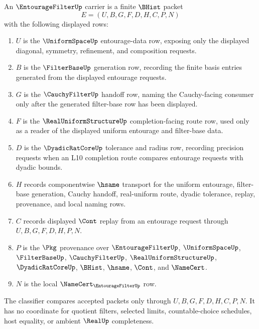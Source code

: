 \begin{definition}
\label{def:entourage-filter-carrier}
An $\EntourageFilterUp$ carrier is a finite $\BHist$ packet
$$
E=(U,B,G,F,D,H,C,P,N)
$$
with the following displayed rows:
\begin{enumerate}
\item $U$ is the $\UniformSpaceUp$ entourage-data row, exposing only the displayed diagonal, symmetry, refinement, and composition requests.
\item $B$ is the $\FilterBaseUp$ generation row, recording the finite basis entries generated from the displayed entourage requests.
\item $G$ is the $\CauchyFilterUp$ handoff row, naming the Cauchy-facing consumer only after the generated filter-base row has been displayed.
\item $F$ is the $\RealUniformStructureUp$ completion-facing route row, used only as a reader of the displayed uniform entourage and filter-base data.
\item $D$ is the $\DyadicRatCoreUp$ tolerance and radius row, recording precision requests when an L10 completion route compares entourage requests with dyadic bounds.
\item $H$ records componentwise $\hsame$ transport for the uniform entourage, filter-base generation, Cauchy handoff, real-uniform route, dyadic tolerance, replay, provenance, and local naming rows.
\item $C$ records displayed $\Cont$ replay from an entourage request through $U,B,G,F,D,H,P,N$.
\item $P$ is the $\Pkg$ provenance over $\EntourageFilterUp$, $\UniformSpaceUp$, $\FilterBaseUp$, $\CauchyFilterUp$, $\RealUniformStructureUp$, $\DyadicRatCoreUp$, $\BHist$, $\hsame$, $\Cont$, and $\NameCert$.
\item $N$ is the local $\NameCert_{\EntourageFilterUp}$ row.
\end{enumerate}
The classifier compares accepted packets only through $U,B,G,F,D,H,C,P,N$. It has no coordinate for quotient filters, selected limits, countable-choice schedules, host equality, or ambient $\RealUp$ completeness.
\end{definition}

